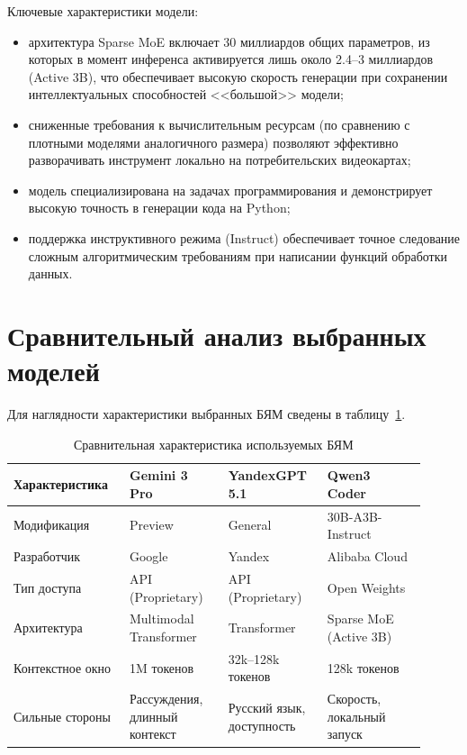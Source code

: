 Ключевые характеристики модели:
\begin{itemize}
    \item архитектура Sparse MoE включает 30 миллиардов общих параметров, из которых в момент инференса активируется лишь около 2.4--3 миллиардов (Active 3B), что обеспечивает высокую скорость генерации при сохранении интеллектуальных способностей <<большой>> модели;
    \item сниженные требования к вычислительным ресурсам (по сравнению с плотными моделями аналогичного размера) позволяют эффективно разворачивать инструмент локально на потребительских видеокартах;
    \item модель специализирована на задачах программирования и демонстрирует высокую точность в генерации кода на Python;
    \item поддержка инструктивного режима (Instruct) обеспечивает точное следование сложным алгоритмическим требованиям при написании функций обработки данных.
\end{itemize}


\section{Сравнительный анализ выбранных моделей}
Для наглядности характеристики выбранных БЯМ сведены в таблицу~\ref{tab:llm_comparison}.

\begin{table}[H]
    \centering
    \caption{Сравнительная характеристика используемых БЯМ}
    \label{tab:llm_comparison}
    \begin{tabular}{|p{0.25\linewidth}|p{0.22\linewidth}|p{0.22\linewidth}|p{0.22\linewidth}|}
        \hline
        \textbf{Характеристика} & \textbf{Gemini 3 Pro} & \textbf{YandexGPT 5.1} & \textbf{Qwen3 Coder} \\
        \hline
        Модификация & Preview & General & 30B-A3B-Instruct \\
        \hline
        Разработчик & Google & Yandex & Alibaba Cloud \\
        \hline
        Тип доступа & API (Proprietary) & API (Proprietary) & Open Weights \\
        \hline
        Архитектура & Multimodal Transformer & Transformer & Sparse MoE (Active 3B) \\
        \hline
        Контекстное окно & 1M токенов & 32k--128k токенов & 128k токенов \\
        \hline
        Сильные стороны & Рассуждения, длинный контекст & Русский язык, доступность & Скорость, локальный запуск \\
        \hline
    \end{tabular}
\end{table}

\clearpage
